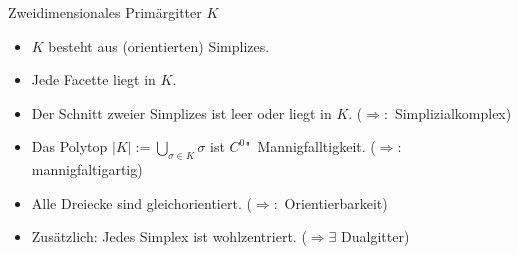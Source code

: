 \documentclass{beamer}
\begin{document}
  \begin{frame}
    \small
    \begin{block}{Zweidimensionales Primärgitter \( K \)}
      \begin{itemize}
        \setlength{\itemsep}{1pt}
        \item<1-> \( K \) besteht aus (orientierten) Simplizes.
        \item<2-> Jede Facette liegt in \( K \).
        \item<4-> Der Schnitt zweier Simplizes ist leer oder liegt in \( K \). (\( \Rightarrow :\) Simplizialkomplex)
        \item<6-> Das Polytop \( |K|:= \bigcup_{\sigma\in K} \sigma \) ist \( C^{0} \)"~Mannigfalltigkeit. (\( \Rightarrow :\) mannigfaltigartig)
        \item<8-> Alle Dreiecke sind gleichorientiert. (\( \Rightarrow :\) Orientierbarkeit)
        \item<9-> Zusätzlich: Jedes Simplex ist wohlzentriert. (\( \Rightarrow\exists \) Dualgitter)
      \end{itemize}
    \end{block}
      \begin{overprint}
         \centering
         \centering
         \centering
         \centering
         \centering
         \centering
         \centering
         \centering
         \centering
         \centering
      \end{overprint}
  \end{frame}
\end{document}
